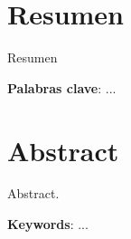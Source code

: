 \begingroup
\let\clearpage\relax
\let\cleardoublepage\relax
\let\cleardoublepage\relax

\chapter*{Resumen}
Resumen

\medskip

\textbf{Palabras clave}: ...

\vfill

\chapter*{Abstract}
Abstract.

\medskip

\textbf{Keywords}: ...


\endgroup

\vfill
